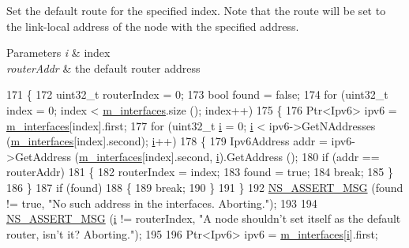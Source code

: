 Set the default route for the specified index. Note that the route will be set to the link-\/local address of the node with the specified address. 


\begin{DoxyParams}{Parameters}
{\em i} & index \\
\hline
{\em router\+Addr} & the default router address \\
\hline
\end{DoxyParams}

\begin{DoxyCode}
171 \{
172   uint32\_t routerIndex = 0;
173   \textcolor{keywordtype}{bool} found = \textcolor{keyword}{false};
174   \textcolor{keywordflow}{for} (uint32\_t index = 0; index < \hyperlink{classns3_1_1Ipv6InterfaceContainer_a559846ada263de96a3a5d0408824712d}{m\_interfaces}.size (); index++)
175     \{
176       Ptr<Ipv6> ipv6 = \hyperlink{classns3_1_1Ipv6InterfaceContainer_a559846ada263de96a3a5d0408824712d}{m\_interfaces}[index].first;
177       \textcolor{keywordflow}{for} (uint32\_t \hyperlink{bernuolliDistribution_8m_a6f6ccfcf58b31cb6412107d9d5281426}{i} = 0; \hyperlink{bernuolliDistribution_8m_a6f6ccfcf58b31cb6412107d9d5281426}{i} < ipv6->GetNAddresses (\hyperlink{classns3_1_1Ipv6InterfaceContainer_a559846ada263de96a3a5d0408824712d}{m\_interfaces}[index].second); 
      \hyperlink{bernuolliDistribution_8m_a6f6ccfcf58b31cb6412107d9d5281426}{i}++)
178         \{
179           Ipv6Address addr = ipv6->GetAddress (\hyperlink{classns3_1_1Ipv6InterfaceContainer_a559846ada263de96a3a5d0408824712d}{m\_interfaces}[index].second, 
      \hyperlink{bernuolliDistribution_8m_a6f6ccfcf58b31cb6412107d9d5281426}{i}).GetAddress ();
180           \textcolor{keywordflow}{if} (addr == routerAddr)
181             \{
182               routerIndex = index;
183               found = \textcolor{keyword}{true};
184               \textcolor{keywordflow}{break};
185             \}
186         \}
187       \textcolor{keywordflow}{if} (found)
188         \{
189           \textcolor{keywordflow}{break};
190         \}
191     \}
192   \hyperlink{assert_8h_aff5ece9066c74e681e74999856f08539}{NS\_ASSERT\_MSG} (found != \textcolor{keyword}{true}, \textcolor{stringliteral}{"No such address in the interfaces. Aborting."});
193 
194   \hyperlink{assert_8h_aff5ece9066c74e681e74999856f08539}{NS\_ASSERT\_MSG} (\hyperlink{bernuolliDistribution_8m_a6f6ccfcf58b31cb6412107d9d5281426}{i} != routerIndex, \textcolor{stringliteral}{"A node shouldn't set itself as the default router, isn't
       it? Aborting."});
195 
196   Ptr<Ipv6> ipv6 = \hyperlink{classns3_1_1Ipv6InterfaceContainer_a559846ada263de96a3a5d0408824712d}{m\_interfaces}[\hyperlink{bernuolliDistribution_8m_a6f6ccfcf58b31cb6412107d9d5281426}{i}].first;

\end{DoxyCode}
